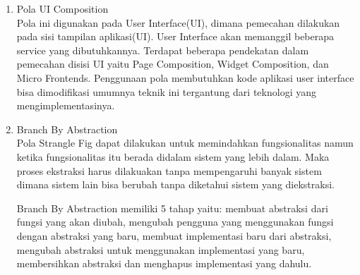 \begin{enumerate}[leftmargin=1.3cm]
	\item Pola UI Composition\\
		  Pola ini digunakan pada User Interface(UI), dimana pemecahan dilakukan pada sisi tampilan aplikasi(UI). User Interface akan memanggil beberapa service yang dibutuhkannya. Terdapat beberapa pendekatan dalam pemecahan disisi UI yaitu Page Composition, Widget Composition, dan Micro Frontends. Penggunaan pola membutuhkan kode aplikasi user interface bisa dimodifikasi umumnya teknik ini tergantung dari teknologi yang mengimplementasinya.
	\item Branch By Abstraction\\
		  Pola Strangle Fig dapat dilakukan untuk memindahkan fungsionalitas namun ketika fungsionalitas itu berada didalam sistem yang lebih dalam. Maka proses ekstraksi harus dilakuakan tanpa mempengaruhi banyak sistem dimana sistem lain bisa berubah tanpa diketahui sistem yang diekstraksi. 

		  Branch By Abstraction memiliki 5 tahap yaitu: membuat abstraksi dari fungsi yang akan diubah, mengubah pengguna yang menggunakan fungsi dengan abstraksi yang baru, membuat implementasi baru dari abstraksi, mengubah abstraksi untuk menggunakan implementasi yang baru, membersihkan abstraksi dan menghapus implementasi yang dahulu.


\end{enumerate}
